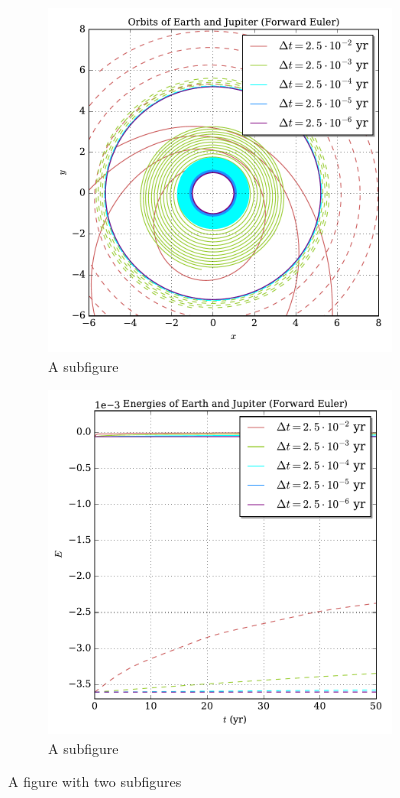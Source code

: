 \documentclass[prb,aps,twocolumn,showpacs,10pt]{revtex4-1}
\begin{document}
\begin{figure}
\centering
\begin{subfigure}{.5\textwidth}
  \centering
  \includegraphics[width=\linewidth]{trinary_fixed_euler_orbit.pdf}
  \caption{A subfigure}
  \label{fig:sub1}
\end{subfigure}%
\begin{subfigure}{.5\textwidth}
  \centering
  \includegraphics[width=\linewidth]{trinary_fixed_euler_energy.pdf}
  \caption{A subfigure}
  \label{fig:sub2}
\end{subfigure}
\caption{A figure with two subfigures}
\label{fig:test}
\end{figure}
\end{document}
